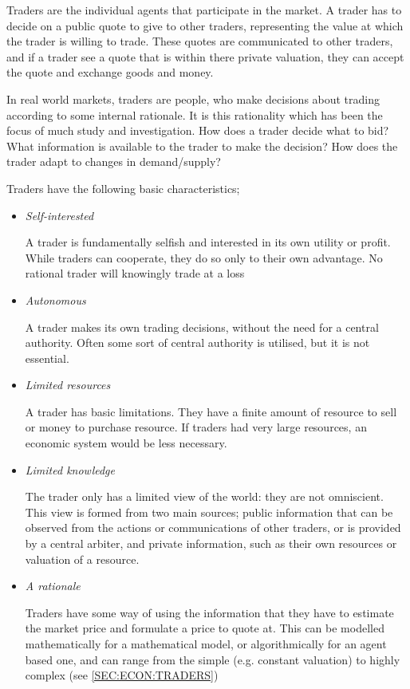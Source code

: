 Traders are the individual agents that participate in the market. A trader has
to decide on a public quote to give to other traders, representing the value at
which the trader is willing to trade. These quotes are communicated to other
traders, and if a trader see a quote that is within there private valuation,
they can accept the quote and exchange goods and money.

In real world markets, traders are people, who make decisions about trading
according to some internal rationale. It is this rationality which has been the
focus of much study and investigation. How does a trader decide what to bid?
What information is available to the trader to make the decision? How does the
trader adapt to changes in demand/supply?

Traders have the following basic characteristics;

\begin{itemize} 
  
  \item{\emph{Self-interested}}

    A trader is fundamentally selfish and interested in its own utility or
    profit.  While traders can cooperate, they do so only to their own
    advantage. No rational trader will knowingly trade at a loss

  \item{\emph{Autonomous}}

    A trader makes its own trading decisions, without the need for a central
    authority. Often some sort of central authority is utilised, but it is not
    essential.

  \item{\emph{Limited resources}} 

    A trader has basic limitations. They have a finite amount of resource to
    sell or money to purchase resource. If traders had very large resources, an
    economic system would be less necessary.

  \item{\emph{Limited knowledge}}

    The trader only has a limited view of the world: they are not omniscient.
    This view is formed from two main sources; public information that can be
    observed from the actions or communications of other traders, or is
    provided by a central arbiter, and private information, such as their own
    resources or valuation of a resource.

  \item{\emph{A rationale}}

    Traders have some way of using the information that they have to estimate
    the market price and formulate a price to quote at. This can be modelled
    mathematically for a mathematical model, or algorithmically for an agent
    based one, and can range from the simple (e.g. constant valuation) to
    highly complex (see \ref{SEC:ECON:TRADERS})

\end{itemize}

